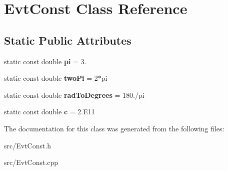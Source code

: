 \hypertarget{class_evt_const}{}\section{Evt\+Const Class Reference}
\label{class_evt_const}
\subsection*{Static Public Attributes}
\begin{DoxyCompactItemize}
\item 
\hypertarget{class_evt_const_a67a7ad0553591d1729a42362748d1152}{}static const double {\bfseries pi} = 3.\label{class_evt_const_a67a7ad0553591d1729a42362748d1152}

\item 
\hypertarget{class_evt_const_a8637e48365373d5e582bce848f627a87}{}static const double {\bfseries two\+Pi} = 2$\ast$pi\label{class_evt_const_a8637e48365373d5e582bce848f627a87}

\item 
\hypertarget{class_evt_const_a8527c836434ab500aedd1a292045e458}{}static const double {\bfseries rad\+To\+Degrees} = 180./pi\label{class_evt_const_a8527c836434ab500aedd1a292045e458}

\item 
\hypertarget{class_evt_const_a50d38f135f3236dd6a3ba5fdbb89c8e3}{}static const double {\bfseries c} = 2.\+E11\label{class_evt_const_a50d38f135f3236dd6a3ba5fdbb89c8e3}

\end{DoxyCompactItemize}


The documentation for this class was generated from the following files\+:\begin{DoxyCompactItemize}
\item 
src/Evt\+Const.\+h\item 
src/Evt\+Const.\+cpp\end{DoxyCompactItemize}
